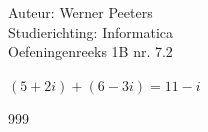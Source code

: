 \documentclass[a4paper]{article}
\begin{document}
\noindent \large Auteur: Werner Peeters \\
\noindent \large Studierichting: Informatica\\
\noindent \large Oefeningenreeks 1B nr. 7.2\\

\medskip

\normalsize

$(5+2i)+(6-3i) = 11-i$




\begin{thebibliography}{999}
\end{thebibliography}
\end{document}
